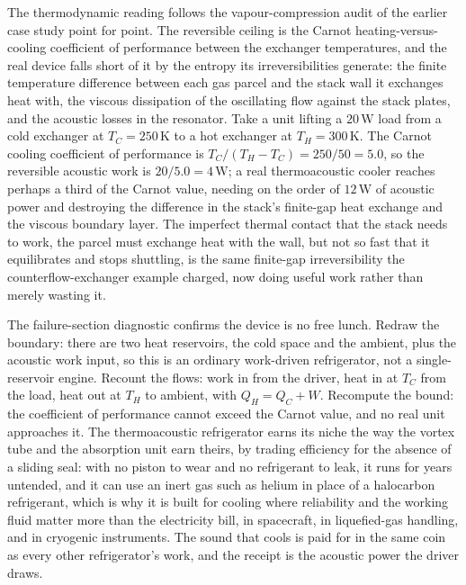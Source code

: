 The thermodynamic reading follows the vapour-compression audit of the earlier case
study point for point. The reversible ceiling is the Carnot heating-versus-cooling
coefficient of performance between the exchanger temperatures, and the real device
falls short of it by the entropy its irreversibilities generate: the finite
temperature difference between each gas parcel and the stack wall it exchanges heat
with, the viscous dissipation of the oscillating flow against the stack plates, and
the acoustic losses in the resonator. Take a unit lifting a $20\,\text{W}$ load from
a cold exchanger at $T_C = 250\,\si{\kelvin}$ to a hot exchanger at $T_H =
300\,\si{\kelvin}$. The Carnot cooling coefficient of performance is $T_C/(T_H -
T_C) = 250/50 = 5.0$, so the reversible acoustic work is $20/5.0 = 4\,\text{W}$; a
real thermoacoustic cooler reaches perhaps a third of the Carnot value, needing on
the order of $12\,\text{W}$ of acoustic power and destroying the difference in the
stack's finite-gap heat exchange and the viscous boundary layer. The imperfect
thermal contact that the stack needs to work, the parcel must exchange heat with the
wall, but not so fast that it equilibrates and stops shuttling, is the same
finite-gap irreversibility the counterflow-exchanger example charged, now doing
useful work rather than merely wasting it.

The failure-section diagnostic confirms the device is no free lunch. Redraw the
boundary: there are two heat reservoirs, the cold space and the ambient, plus the
acoustic work input, so this is an ordinary work-driven refrigerator, not a
single-reservoir engine. Recount the flows: work in from the driver, heat in at
$T_C$ from the load, heat out at $T_H$ to ambient, with $Q_H = Q_C + W$. Recompute
the bound: the coefficient of performance cannot exceed the Carnot value, and no
real unit approaches it. The thermoacoustic refrigerator earns its niche the way
the vortex tube and the absorption unit earn theirs, by trading efficiency for the
absence of a sliding seal: with no piston to wear and no refrigerant to leak, it
runs for years untended, and it can use an inert gas such as helium in place of a
halocarbon refrigerant, which is why it is built for cooling where reliability and
the working fluid matter more than the electricity bill, in spacecraft, in
liquefied-gas handling, and in cryogenic instruments. The sound that cools is paid
for in the same coin as every other refrigerator's work, and the receipt is the
acoustic power the driver draws.



